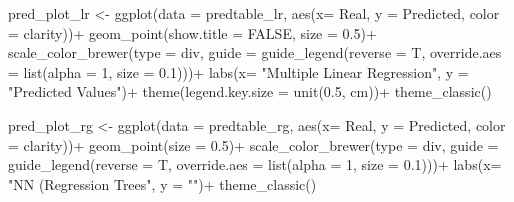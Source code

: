 \documentclass[
]{article}
\newenvironment{Shaded}{\begin{snugshade}}{\end{snugshade}}
\newcommand{\AttributeTok}[1]{\textcolor[rgb]{0.77,0.63,0.00}{#1}}
\newcommand{\ConstantTok}[1]{\textcolor[rgb]{0.00,0.00,0.00}{#1}}
\newcommand{\DecValTok}[1]{\textcolor[rgb]{0.00,0.00,0.81}{#1}}
\newcommand{\FloatTok}[1]{\textcolor[rgb]{0.00,0.00,0.81}{#1}}
\newcommand{\FunctionTok}[1]{\textcolor[rgb]{0.00,0.00,0.00}{#1}}
\newcommand{\NormalTok}[1]{#1}
\newcommand{\OtherTok}[1]{\textcolor[rgb]{0.56,0.35,0.01}{#1}}
\newcommand{\SpecialCharTok}[1]{\textcolor[rgb]{0.00,0.00,0.00}{#1}}
\newcommand{\StringTok}[1]{\textcolor[rgb]{0.31,0.60,0.02}{#1}}
\begin{document}
\begin{Shaded}
\begin{Highlighting}[]
\NormalTok{pred\_plot\_lr }\OtherTok{\textless{}{-}} \FunctionTok{ggplot}\NormalTok{(}\AttributeTok{data =}\NormalTok{ predtable\_lr, }\FunctionTok{aes}\NormalTok{(}\AttributeTok{x=}\NormalTok{ Real, }\AttributeTok{y =}\NormalTok{ Predicted, }\AttributeTok{color =}\NormalTok{ clarity))}\SpecialCharTok{+}
  \FunctionTok{geom\_point}\NormalTok{(}\AttributeTok{show.title =} \ConstantTok{FALSE}\NormalTok{, }\AttributeTok{size =} \FloatTok{0.5}\NormalTok{)}\SpecialCharTok{+}
  \FunctionTok{scale\_color\_brewer}\NormalTok{(}\AttributeTok{type =} \StringTok{\textquotesingle{}div\textquotesingle{}}\NormalTok{, }\AttributeTok{guide =} \FunctionTok{guide\_legend}\NormalTok{(}\AttributeTok{reverse =}\NormalTok{ T, }\AttributeTok{override.aes =} \FunctionTok{list}\NormalTok{(}\AttributeTok{alpha =} \DecValTok{1}\NormalTok{, }\AttributeTok{size =} \FloatTok{0.1}\NormalTok{)))}\SpecialCharTok{+}
  \FunctionTok{labs}\NormalTok{(}\AttributeTok{x=} \StringTok{"Multiple Linear Regression"}\NormalTok{, }\AttributeTok{y =} \StringTok{"Predicted Values"}\NormalTok{)}\SpecialCharTok{+}
  \FunctionTok{theme}\NormalTok{(}\AttributeTok{legend.key.size =} \FunctionTok{unit}\NormalTok{(}\FloatTok{0.5}\NormalTok{, }\StringTok{\textquotesingle{}cm\textquotesingle{}}\NormalTok{))}\SpecialCharTok{+}
  \FunctionTok{theme\_classic}\NormalTok{()}

\NormalTok{pred\_plot\_rg }\OtherTok{\textless{}{-}} \FunctionTok{ggplot}\NormalTok{(}\AttributeTok{data =}\NormalTok{ predtable\_rg, }\FunctionTok{aes}\NormalTok{(}\AttributeTok{x=}\NormalTok{ Real, }\AttributeTok{y =}\NormalTok{ Predicted, }\AttributeTok{color =}\NormalTok{ clarity))}\SpecialCharTok{+}
  \FunctionTok{geom\_point}\NormalTok{(}\AttributeTok{size =} \FloatTok{0.5}\NormalTok{)}\SpecialCharTok{+}
  \FunctionTok{scale\_color\_brewer}\NormalTok{(}\AttributeTok{type =} \StringTok{\textquotesingle{}div\textquotesingle{}}\NormalTok{, }\AttributeTok{guide =} \FunctionTok{guide\_legend}\NormalTok{(}\AttributeTok{reverse =}\NormalTok{ T, }\AttributeTok{override.aes =} \FunctionTok{list}\NormalTok{(}\AttributeTok{alpha =} \DecValTok{1}\NormalTok{, }\AttributeTok{size =} \FloatTok{0.1}\NormalTok{)))}\SpecialCharTok{+}
  \FunctionTok{labs}\NormalTok{(}\AttributeTok{x=} \StringTok{"NN (Regression Trees"}\NormalTok{, }\AttributeTok{y =} \StringTok{""}\NormalTok{)}\SpecialCharTok{+}
  \FunctionTok{theme\_classic}\NormalTok{()}


\end{Highlighting}
\end{Shaded}
\end{document}
